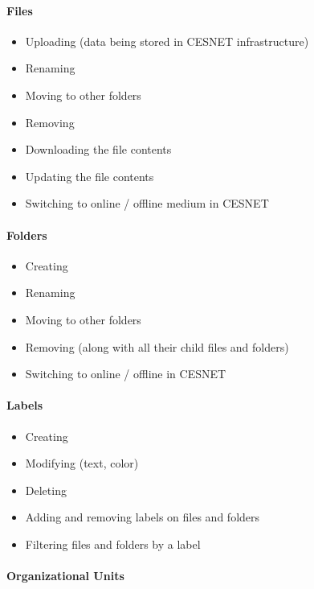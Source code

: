 \documentclass{book}
\begin{document}
\paragraph{Files}\label{files}

\begin{itemize}
\tightlist
\item
  Uploading (data being stored in CESNET infrastructure)
\item
  Renaming
\item
  Moving to other folders
\item
  Removing
\item
  Downloading the file contents
\item
  Updating the file contents
\item
  Switching to online / offline medium in CESNET
\end{itemize}

\paragraph{Folders}\label{folders}

\begin{itemize}
\tightlist
\item
  Creating
\item
  Renaming
\item
  Moving to other folders
\item
  Removing (along with all their child files and folders)
\item
  Switching to online / offline in CESNET
\end{itemize}

\paragraph{Labels}\label{labels}

\begin{itemize}
\tightlist
\item
  Creating
\item
  Modifying (text, color)
\item
  Deleting
\item
  Adding and removing labels on files and folders
\item
  Filtering files and folders by a label
\end{itemize}

\paragraph{Organizational Units}\label{organizational-units}
\end{document}
